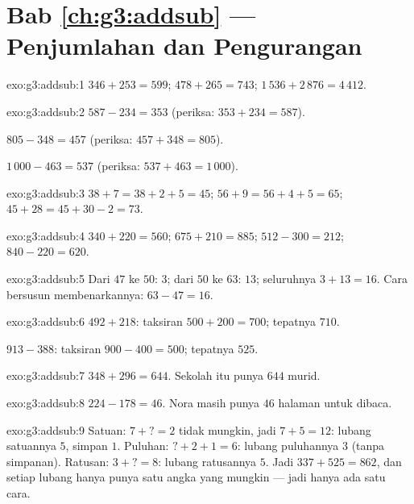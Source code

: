 \section*{Bab \ref{ch:g3:addsub} --- Penjumlahan dan Pengurangan}

\begin{solution}{exo:g3:addsub:1}
$346 + 253 = 599$; \quad
$478 + 265 = 743$; \quad
$1\,536 + 2\,876 = 4\,412$.
\end{solution}

\begin{solution}{exo:g3:addsub:2}
$587 - 234 = 353$ (periksa: $353 + 234 = 587$).

$805 - 348 = 457$ (periksa: $457 + 348 = 805$).

$1\,000 - 463 = 537$ (periksa: $537 + 463 = 1\,000$).
\end{solution}

\begin{solution}{exo:g3:addsub:3}
$38 + 7 = 38 + 2 + 5 = 45$; \quad
$56 + 9 = 56 + 4 + 5 = 65$; \quad
$45 + 28 = 45 + 30 - 2 = 73$.
\end{solution}

\begin{solution}{exo:g3:addsub:4}
$340 + 220 = 560$; \quad $675 + 210 = 885$; \quad
$512 - 300 = 212$; \quad $840 - 220 = 620$.
\end{solution}

\begin{solution}{exo:g3:addsub:5}
Dari $47$ ke $50$: $3$; dari $50$ ke $63$: $13$; seluruhnya
$3 + 13 = 16$. Cara bersusun membenarkannya: $63 - 47 = 16$.
\end{solution}

\begin{solution}{exo:g3:addsub:6}
$492 + 218$: taksiran $500 + 200 = 700$; tepatnya $710$.

$913 - 388$: taksiran $900 - 400 = 500$; tepatnya $525$.
\end{solution}

\begin{solution}{exo:g3:addsub:7}
$348 + 296 = 644$. Sekolah itu punya $644$ murid.
\end{solution}

\begin{solution}{exo:g3:addsub:8}
$224 - 178 = 46$. Nora masih punya $46$ halaman untuk dibaca.
\end{solution}

\begin{solution}{exo:g3:addsub:9}
Satuan: $7 + \text{?} = 2$ tidak mungkin, jadi $7 + 5 = 12$: lubang
satuannya $5$, simpan $1$. Puluhan: $\text{?} + 2 + 1 = 6$: lubang
puluhannya $3$ (tanpa simpanan). Ratusan: $3 + \text{?} = 8$: lubang
ratusannya $5$. Jadi $337 + 525 = 862$, dan setiap lubang hanya
punya satu angka yang mungkin --- jadi hanya ada satu cara.
\end{solution}

